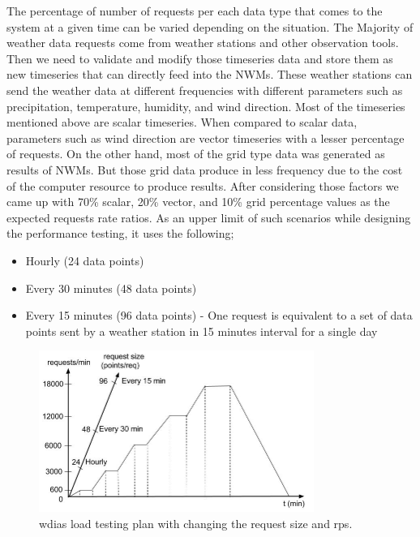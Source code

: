 The percentage of number of requests per each data type that comes to the system at a given time can be varied depending on the situation. The Majority of weather data requests come from weather stations and other observation tools. Then we need to validate and modify those timeseries data and store them as new timeseries that can directly feed into the NWMs. These weather stations can send the weather data at different frequencies with different parameters such as precipitation, temperature, humidity, and wind direction. Most of the timeseries mentioned above are scalar timeseries. When compared to scalar data, parameters such as wind direction are vector timeseries with a lesser percentage of requests. On the other hand, most of the grid type data was generated as results of NWMs. But those grid data produce in less frequency due to the cost of the computer resource to produce results. After considering those factors we came up with 70\% scalar, 20\% vector, and 10\% grid percentage values as the expected requests rate ratios.
As an upper limit of such scenarios while designing the performance testing, it uses the following;
\begin{itemize}
    \item Hourly (24 data points)
    \item Every 30 minutes (48 data points)
    \item Every 15 minutes (96 data points) - One request is equivalent to a set of data points sent by a weather station in 15 minutes interval for a single day
\end{itemize}

\begin{figure}[htp]
    \centering
    \includegraphics[width=0.8\textwidth]{results/work_load/performance_study_v4.jpg}
    \caption{\acrshort{wdias} load testing plan with changing the request size and \acrshort{rps}.}
    \label{fi:performance_study_load}
\end{figure}

